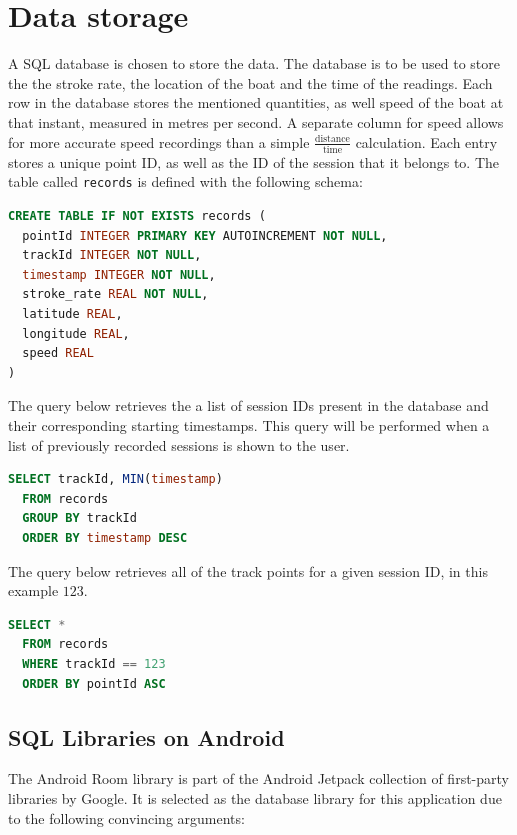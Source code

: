 \documentclass[11pt,twoside,a4paper]{report}
\begin{document}
\section{Data storage}

A SQL database is chosen to store the data. The database is to be used to store the the stroke rate, the location of the boat and the time of the readings. Each row in the database stores the mentioned quantities, as well speed of the boat at that instant, measured in metres per second. A separate column for speed allows for more accurate speed recordings than a simple $\frac{\text{distance}}{\text{time}}$ calculation. Each entry stores a unique point ID, as well as the ID of the session that it belongs to. The table called \texttt{records} is defined with the following schema:

\begin{lstlisting}[language=sql]
CREATE TABLE IF NOT EXISTS records (
  pointId INTEGER PRIMARY KEY AUTOINCREMENT NOT NULL,
  trackId INTEGER NOT NULL, 
  timestamp INTEGER NOT NULL, 
  stroke_rate REAL NOT NULL, 
  latitude REAL, 
  longitude REAL, 
  speed REAL
)
\end{lstlisting}

The query below retrieves the a list of session IDs present in the database and their corresponding starting timestamps. This query will be performed when a list of previously recorded sessions is shown to the user.
\begin{lstlisting}[language=sql]
  SELECT trackId, MIN(timestamp) 
  FROM records 
  GROUP BY trackId 
  ORDER BY timestamp DESC
\end{lstlisting}

The query below retrieves all of the track points for a given session ID, in this example $123$.
\begin{lstlisting}[language=sql]
  SELECT * 
  FROM records 
  WHERE trackId == 123 
  ORDER BY pointId ASC
\end{lstlisting}

\subsection{SQL Libraries on Android}

The Android Room library is part of the Android Jetpack collection of first-party libraries by Google. It is selected as the database library for this application due to the following convincing arguments:
\end{document}
